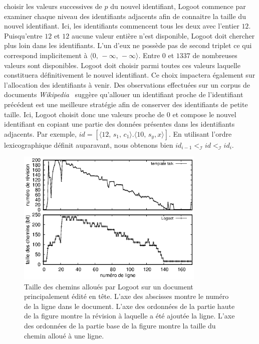 choisir les valeurs successives de $p$ du nouvel identifiant, Logoot commence
par examiner chaque niveau des identifiants adjacents afin de connaitre la
taille du nouvel identifiant. Ici, les identifiants commencent tous les deux
avec l'entier $12$.  Puisqu'entre $12$ et $12$ aucune valeur entière n'est
disponible, Logoot doit chercher plus loin dans les identifiants. L'un d'eux ne
possède pas de second triplet ce qui correspond implicitement à
$\langle 0,\, -\infty ,\, -\infty \rangle$.  Entre $0$ et $1337$ de nombreuses
valeurs sont disponibles.  Logoot doit choisir parmi toutes ces valeurs laquelle
constituera définitivement le nouvel identifiant. Ce choix impactera également
sur l'allocation des identifiants à venir.
Des observations effectuées sur un corpus de documents
\emph{Wikipedia}~\cite{wikipedia} suggère qu'allouer un identifiant proche de
l'identifiant précédent est une meilleure stratégie afin de conserver des
identifiants de petite taille.  Ici, Logoot choisit donc une valeurs proche de
$0$ et compose le nouvel identifiant en copiant une partie des données présentes
dans les identifiants adjacents. Par exemple,
$id = [\langle 12,\, s_1,\,c_1 \rangle.\langle 10,\,s_y, x\rangle]$.  En
utilisant l'ordre lexicographique définit auparavant, nous obtenons bien
$id_{i-1} <_\mathcal{I} id <_\mathcal{I} id_i$.

\begin{figure}
  \begin{center}
    \includegraphics[width=0.8\textwidth]{img/lseq/motivationlogoot.eps}
    \caption[Taille des chemins alloués par Logoot sur un document édité en
    tête]{\label{repl:img:motivationlogoot} Taille des chemins alloués par
      Logoot sur un document principalement édité en tête. L'axe des abscisses
      montre le numéro de la ligne dans le document. L'axe des ordonnées de la
      partie haute de la figure montre la révision à laquelle a été ajoutée la
      ligne. L'axe des ordonnées de la partie base de la figure montre la taille
      du chemin alloué à une ligne.}
  \end{center}
\end{figure}

